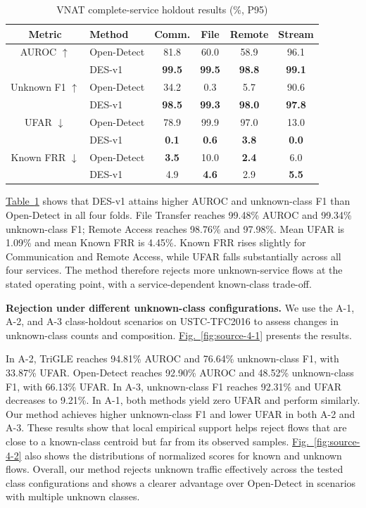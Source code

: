 \begin{table}[H]
\centering
\begingroup
\renewcommand{\thetable}{4-7}
\caption{VNAT complete-service holdout results (\%, P95)}\label{tab:source-7}
\fontsize{6.7}{8}\selectfont
\setlength{\tabcolsep}{1.7pt}
\begin{tabular}{@{}clcccc@{}}
\hline
Metric & Method & Comm. & File & Remote & Stream \\
\hline
AUROC $\uparrow$ & Open-Detect & 81.8 & 60.0 & 58.9 & 96.1 \\
 & DES-v1 & \textbf{99.5} & \textbf{99.5} & \textbf{98.8} & \textbf{99.1} \\
Unknown F1 $\uparrow$ & Open-Detect & 34.2 & 0.3 & 5.7 & 90.6 \\
 & DES-v1 & \textbf{98.5} & \textbf{99.3} & \textbf{98.0} & \textbf{97.8} \\
UFAR $\downarrow$ & Open-Detect & 78.9 & 99.9 & 97.0 & 13.0 \\
 & DES-v1 & \textbf{0.1} & \textbf{0.6} & \textbf{3.8} & \textbf{0.0} \\
Known FRR $\downarrow$ & Open-Detect & \textbf{3.5} & 10.0 & \textbf{2.4} & 6.0 \\
 & DES-v1 & 4.9 & \textbf{4.6} & 2.9 & \textbf{5.5} \\
\hline
\end{tabular}
\endgroup
\end{table}


\hyperref[tab:source-7]{Table~\ref*{tab:source-7}} shows that DES-v1 attains higher AUROC and unknown-class F1 than Open-Detect in all four folds. File Transfer reaches 99.48\% AUROC and 99.34\% unknown-class F1; Remote Access reaches 98.76\% and 97.98\%. Mean UFAR is 1.09\% and mean Known FRR is 4.45\%. Known FRR rises slightly for Communication and Remote Access, while UFAR falls substantially across all four services. The method therefore rejects more unknown-service flows at the stated operating point, with a service-dependent known-class trade-off.

\textbf{Rejection under different unknown-class configurations.} We use the A-1, A-2, and A-3 class-holdout scenarios on USTC-TFC2016 to assess changes in unknown-class counts and composition. \hyperref[fig:source-4-1]{Fig.~\ref*{fig:source-4-1}} presents the results.

In A-2, TriGLE reaches 94.81\% AUROC and 76.64\% unknown-class F1, with 33.87\% UFAR. Open-Detect reaches 92.90\% AUROC and 48.52\% unknown-class F1, with 66.13\% UFAR. In A-3, unknown-class F1 reaches 92.31\% and UFAR decreases to 9.21\%. In A-1, both methods yield zero UFAR and perform similarly. Our method achieves higher unknown-class F1 and lower UFAR in both A-2 and A-3. These results show that local empirical support helps reject flows that are close to a known-class centroid but far from its observed samples. \hyperref[fig:source-4-2]{Fig.~\ref*{fig:source-4-2}} also shows the distributions of normalized scores for known and unknown flows. Overall, our method rejects unknown traffic effectively across the tested class configurations and shows a clearer advantage over Open-Detect in scenarios with multiple unknown classes.

